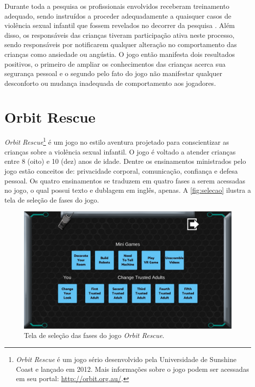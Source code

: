 Durante toda a pesquisa os profissionais envolvidos receberam treinamento adequado, sendo instruídos a proceder adequadamente a quaisquer casos de violência sexual infantil que fossem revelados no decorrer da pesquisa \cite{jones2010being}. Além disso, os responsáveis das crianças tiveram participação ativa neste processo, sendo responsáveis por notificarem qualquer alteração no comportamento das crianças como ansiedade ou angústia. O jogo então manifesta dois resultados positivos, o primeiro de ampliar os conhecimentos das crianças acerca sua segurança pessoal e o segundo pelo fato do jogo não manifestar qualquer desconforto ou mudança inadequada de comportamento aos jogadores. 


\section{Orbit Rescue}\label{sssec:Orbit}

\textit{Orbit Rescue}\footnote{\textit{Orbit Rescue} é um jogo sério desenvolvido pela Universidade de Sunshine Coast e lançado em 2012. Mais informações sobre o jogo podem ser acessadas em seu portal: \url{http://orbit.org.au/}.} é um jogo no estilo aventura projetado para conscientizar as crianças sobre a violência sexual infantil. O jogo é voltado a atender crianças entre 8 (oito) e 10 (dez) anos de idade. Dentre os ensinamentos ministrados pelo jogo estão conceitos de: privacidade corporal, comunicação, confiança e defesa pessoal. Os quatro ensinamentos se traduzem em quatro fases a serem acessadas no jogo, o qual possui texto e dublagem em inglês, apenas. A \autoref{fig:selecao} ilustra a tela de seleção de fases do jogo.

\begin{figure}[htb]
	\caption{\label{fig:selecao}Tela de seleção das fases do jogo \textit{Orbit Rescue}.}
  \begin{center}\vspace{-0.3cm}
    \includegraphics[width=0.92\linewidth]{./Visuais/Orbit/OrbitFases.jpg}
	\end{center}\vspace{-0.2cm}
\end{figure}

